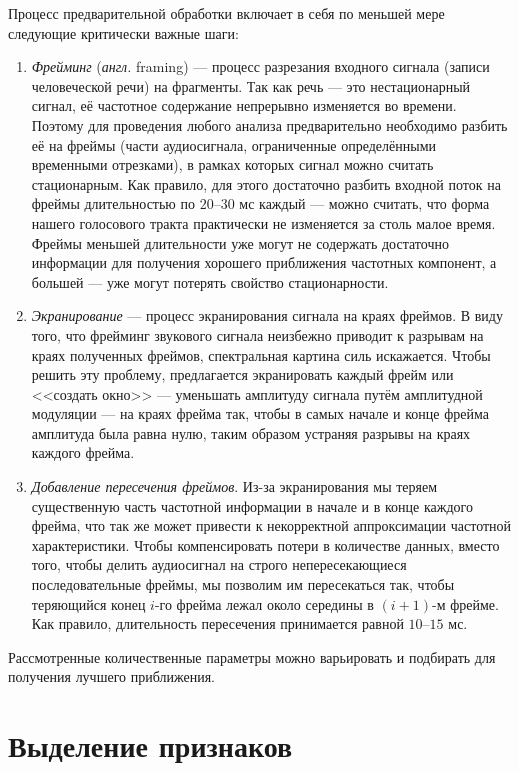 \documentclass{gost-7-32}
\begin{document}
Процесс предварительной обработки включает в себя по меньшей мере \cite{jin_noise_mfcc} следующие критически важные шаги:
\begin{enumerate}
    \item \textit{Фрейминг} (\textit{англ.} framing) --- процесс разрезания входного сигнала (записи человеческой речи) на фрагменты.
        Так как речь --- это нестационарный сигнал, её частотное содержание непрерывно изменяется во времени.
        Поэтому для проведения любого анализа предварительно необходимо разбить её на фреймы (части аудиосигнала, ограниченные определёнными временными отрезками), в рамках которых сигнал можно считать стационарным.
        Как правило, для этого достаточно разбить входной поток на фреймы длительностью по $20$--$30$ мс каждый --- можно считать, что форма нашего голосового тракта практически не изменяется за столь малое время.
        Фреймы меньшей длительности уже могут не содержать достаточно информации для получения хорошего приближения частотных компонент, а большей --- уже могут потерять свойство стационарности.
    \item \textit{Экранирование} --- процесс экранирования сигнала на краях фреймов.
        В виду того, что фрейминг звукового сигнала неизбежно приводит к разрывам на краях полученных фреймов, спектральная картина силь искажается.
        Чтобы решить эту проблему, предлагается экранировать каждый фрейм или <<создать окно>> --- уменьшать амплитуду сигнала путём амплитудной модуляции --- на краях фрейма так, чтобы в самых начале и конце фрейма амплитуда была равна нулю, таким образом устраняя разрывы на краях каждого фрейма.
    \item \textit{Добавление пересечения фреймов}.
        Из-за экранирования мы теряем существенную часть частотной информации в начале и в конце каждого фрейма, что так же может привести к некорректной аппроксимации частотной характеристики.
        Чтобы компенсировать потери в количестве данных, вместо того, чтобы делить аудиосигнал на строго непересекающиеся последовательные фреймы, мы позволим им пересекаться так, чтобы теряющийся конец $i$-го фрейма лежал около середины в $(i+1)$-м фрейме.
        Как правило, длительность пересечения принимается равной $10$--$15$ мс.
\end{enumerate}

Рассмотренные количественные параметры можно варьировать и подбирать для получения лучшего приближения.

\section{Выделение признаков}
\end{document}
